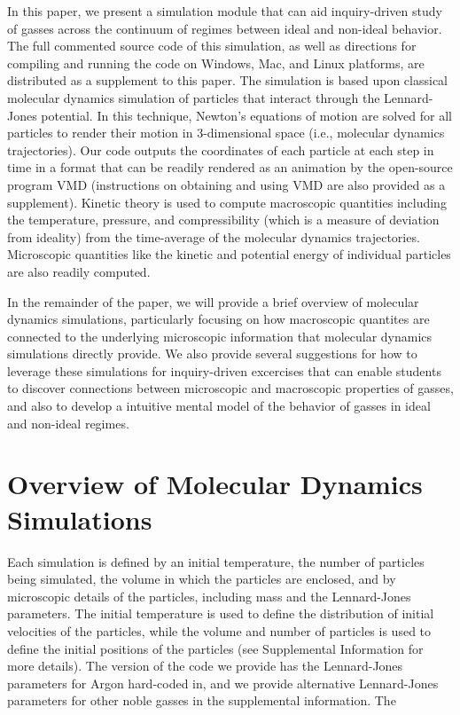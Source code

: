 \documentclass[journal=jpclcd,manuscript=article]{achemso}
\begin{document}
In this paper, we present a simulation module that can aid inquiry-driven study of gasses across
the continuum of regimes between ideal and non-ideal behavior.  The full commented source code of this simulation,
as well as directions for compiling and running the code on Windows, Mac, and Linux platforms, are distributed as a supplement
to this paper.  The simulation is based upon classical molecular dynamics
simulation of particles that interact through the Lennard-Jones potential.  In this technique, Newton's equations of motion 
are solved for all particles to render their motion in 3-dimensional space (i.e., molecular dynamics trajectories).  Our code outputs the coordinates
of each particle at each step in time in a format that can be readily rendered as an animation by the open-source program
VMD (instructions on obtaining and using VMD are also provided as a supplement).  Kinetic theory is used to
compute macroscopic quantities including the temperature, pressure, and compressibility (which is a measure
of deviation from ideality) from the time-average of the molecular dynamics trajectories.  Microscopic quantities like the kinetic
and potential energy of individual particles are also readily computed.  

In the remainder of the paper, we will provide a brief overview of molecular dynamics simulations, particularly focusing on 
how macroscopic quantites are connected to the underlying microscopic information that molecular dynamics simulations directly provide.  We also provide 
several suggestions for how to leverage these simulations for inquiry-driven excercises that can enable students to discover
connections between microscopic and macroscopic properties of gasses, and also to develop a intuitive mental 
model of the behavior of gasses in ideal and non-ideal regimes.  

\section{Overview of Molecular Dynamics Simulations}

Each simulation is defined
by an initial temperature, the number of particles being simulated, the volume in which the particles are enclosed,
and by microscopic details of the particles, including mass and the Lennard-Jones parameters.  The initial temperature
is used to define the distribution of initial velocities of the particles, while the volume and number of particles is used
to define the initial positions of the particles (see Supplemental Information for more details).  The version of the code
we provide has the Lennard-Jones parameters for Argon%
hard-coded in, and we provide alternative Lennard-Jones parameters for other noble gasses in the supplemental information.
The      
\end{document}
